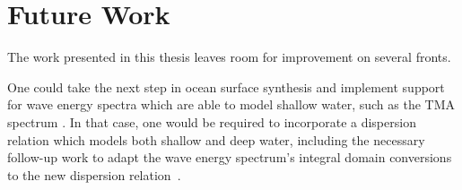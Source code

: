 
%
%
%

%





%

\section{Future Work}
The work presented in this thesis leaves room for improvement on several fronts.

One could take the next step in ocean surface synthesis and implement support
for wave energy spectra which are able to model shallow water, such as the
TMA spectrum \citep{Hughes:1984}. In that case, one would be required to
incorporate a dispersion relation which models both shallow and deep water,
including the necessary follow-up work to adapt the wave energy spectrum's
integral domain conversions to the new dispersion relation~\citep{Horvath:2015}.

